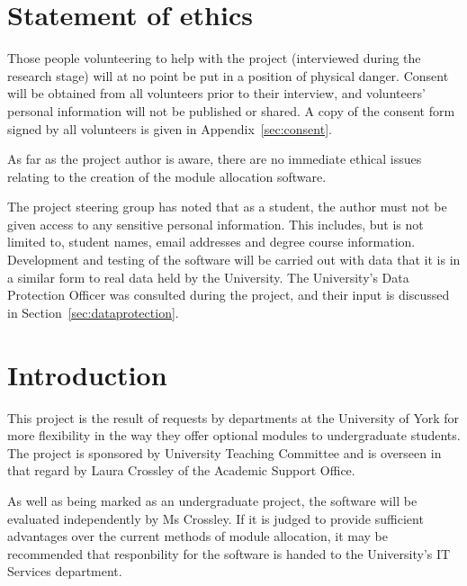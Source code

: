 \documentclass[]{scrartcl}
\begin{document}
\newpage

\tableofcontents

\newpage

\section{Statement of ethics}


Those people volunteering to help with the project (interviewed during the
research stage) will at no point be put in a position of physical danger.
Consent will be obtained from all volunteers prior to their interview, and
volunteers' personal information will not be published or shared. A copy of
the consent form signed by all volunteers is given in
Appendix~\ref{sec:consent}.


As far as the project author is aware, there are no immediate ethical issues
relating to the creation of the module allocation software.


The project steering group has noted that as a student, the author must not be
given access to any sensitive personal information. This includes, but is not
limited to, student names, email addresses and degree course information.
Development and testing of the software will be carried out with data that it
is in a similar form to real data held by the University. The University's
Data Protection Officer was consulted during the project, and their input is
discussed in Section~\ref{sec:dataprotection}.

\section{Introduction}


This project is the result of requests by departments at the University of York for more flexibility in the way they offer optional modules to undergraduate students. The project is sponsored by University Teaching Committee and is overseen in that regard by Laura Crossley of the Academic Support Office.

As well as being marked as an undergraduate project, the software will be evaluated independently by Ms Crossley. If it is judged to provide sufficient advantages over the current methods of module allocation, it may be recommended that responbility for the software is handed to the University's IT Services department.
\end{document}
